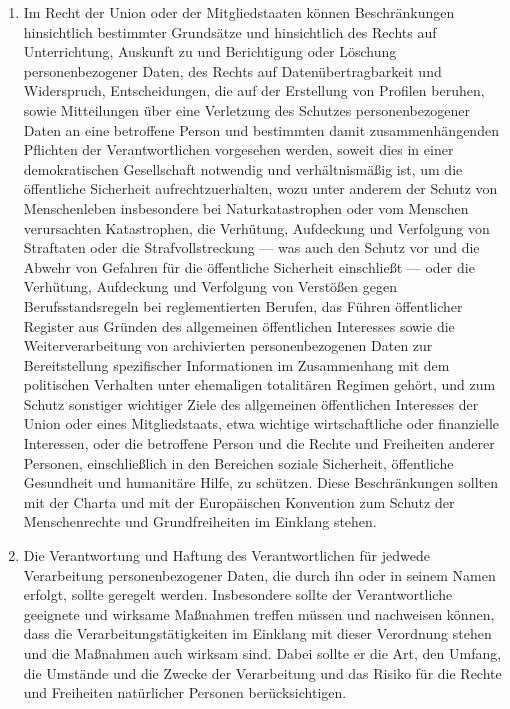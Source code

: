 \begin{enumerate}
   \item Im Recht der Union oder der Mitgliedstaaten können Beschränkungen hinsichtlich bestimmter Grundsätze und
    hinsichtlich des Rechts auf Unterrichtung, Auskunft zu und Berichtigung oder Löschung personenbezogener Daten, des
    Rechts auf Datenübertragbarkeit und Widerspruch, Entscheidungen, die auf der Erstellung von Profilen beruhen, sowie
    Mitteilungen über eine Verletzung des Schutzes personenbezogener Daten an eine betroffene Person und bestimmten
    damit zusammenhängenden Pflichten der Verantwortlichen vorgesehen werden, soweit dies in einer demokratischen
    Gesellschaft notwendig und verhältnismäßig ist, um die öffentliche Sicherheit aufrechtzuerhalten, wozu unter
    anderem der Schutz von Menschenleben insbesondere bei Naturkatastrophen oder vom Menschen verursachten
    Katastrophen, die Verhütung, Aufdeckung und Verfolgung von Straftaten oder die Strafvollstreckung — was auch den
    Schutz vor und die Abwehr von Gefahren für die öffentliche Sicherheit einschließt — oder die Verhütung, Aufdeckung
    und Verfolgung von Verstößen gegen Berufsstandsregeln bei reglementierten Berufen, das Führen öffentlicher Register
    aus Gründen des allgemeinen öffentlichen Interesses sowie die Weiterverarbeitung von archivierten personenbezogenen
    Daten zur Bereitstellung spezifischer Informationen im Zusammenhang mit dem politischen Verhalten unter ehemaligen
    totalitären Regimen gehört, und zum Schutz sonstiger wichtiger Ziele des allgemeinen öffentlichen Interesses der
    Union oder eines Mitgliedstaats, etwa wichtige wirtschaftliche oder finanzielle Interessen, oder die betroffene
    Person und die Rechte und Freiheiten anderer Personen, einschließlich in den Bereichen soziale Sicherheit,
    öffentliche Gesundheit und humanitäre Hilfe, zu schützen. Diese Beschränkungen sollten mit der Charta und mit der
    Europäischen Konvention zum Schutz der Menschenrechte und Grundfreiheiten im Einklang stehen.%
   \label{eg:73}
   

   \item Die Verantwortung und Haftung des Verantwortlichen für jedwede Verarbeitung personenbezogener Daten, die durch
    ihn oder in seinem Namen erfolgt, sollte geregelt werden. Insbesondere sollte der Verantwortliche geeignete und
    wirksame Maßnahmen treffen müssen und nachweisen können, dass die Verarbeitungstätigkeiten im Einklang mit dieser
    Verordnung stehen und die Maßnahmen auch wirksam sind. Dabei sollte er die Art, den Umfang, die Umstände und die
    Zwecke der Verarbeitung und das Risiko für die Rechte und Freiheiten natürlicher Personen berücksichtigen.%
   \label{eg:74}
   

\end{enumerate}
